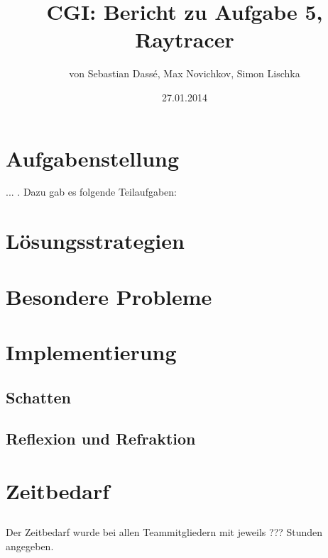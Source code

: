 \documentclass[11pt]{amsart}
\title{CGI: Bericht zu Aufgabe 5, Raytracer}
\author{von Sebastian Dass\'{e}, Max Novichkov, Simon Lischka }
\date{27.01.2014}
\begin{document}
\maketitle

\section{Aufgabenstellung}
... . Dazu gab es folgende 
Teilaufgaben: 

\subsection{}



\section{L\"osungsstrategien}
\subsection{}



\section{Besondere Probleme}
\subsection{}



\section{Implementierung}
\subsection{Schatten}

\subsection{Reflexion und Refraktion}



\section{Zeitbedarf}
\subsection{}
Der Zeitbedarf wurde bei allen Teammitgliedern mit jeweils ??? Stunden angegeben.
\end{document}

